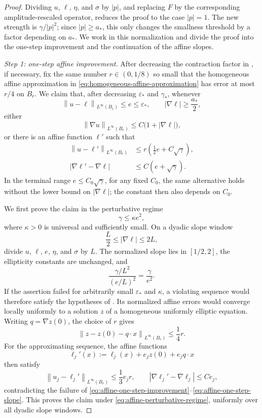 \documentclass[11pt,letterpaper]{amsart}
\numberwithin{equation}{section}
\newcommand{\norm}[1]{\left\lVert #1\right\rVert}
\theoremstyle{definition}
\theoremstyle{remark}
\begin{document}
\begin{proof}
Dividing $u$, $\ell$, $\eta$, and $\sigma$ by $|p|$, and replacing $F$ by
the corresponding amplitude-rescaled operator, reduces the proof to the
case $|p|=1$. The new strength is $\gamma/|p|^2$; since $|p|\geq a_*$,
this only changes the smallness threshold by a factor depending on $a_*$. We
work in this normalization and divide the proof into the one-step
improvement and the continuation of the affine slopes.

\medskip
\noindent
\emph{Step 1: one-step affine improvement.}
After decreasing the contraction factor in
, if necessary, fix the same number
$r\in(0,1/8)$ so small that the homogeneous affine approximation in
\eqref{eq:homogeneous-affine-approximation} has error at most $r/4$ on
$B_r$. We claim that, after decreasing $\varepsilon_*$ and $\gamma_*$,
whenever
$$
\norm{u-\ell}_{L^\infty(B_1)}\leq e\leq\varepsilon_*,
\qquad
|\nabla\ell|\geq\frac{a_*}{2},
$$
either
\begin{equation}\label{eq:affine-one-step-lipschitz}
\norm{\nabla u}_{L^\infty(B_r)}
\leq C\bigl(1+|\nabla\ell|\bigr),
\end{equation}
or there is an affine function $\ell'$ such that
\begin{align}
\norm{u-\ell'}_{L^\infty(B_r)}
&\leq
r\left(\frac12e+C\sqrt\gamma\right),
\label{eq:affine-one-step-improvement}
\\
|\nabla\ell'-\nabla\ell|
&\leq
C\left(e+\sqrt\gamma\right).
\label{eq:affine-one-step-slope}
\end{align}
In the terminal range $e\leq C_0\sqrt\gamma$, for any fixed $C_0$, the
same alternative holds without the lower bound on $|\nabla\ell|$; the
constant then also depends on $C_0$.

We first prove the claim in the perturbative regime
\begin{equation}\label{eq:affine-perturbative-regime}
\gamma\leq\kappa e^2,
\end{equation}
where $\kappa>0$ is universal and sufficiently small. On a dyadic slope
window
$$
\frac{L}{2}\leq|\nabla\ell|\leq2L,
$$
divide $u$, $\ell$, $e$, $\eta$, and $\sigma$ by $L$. The normalized slope
lies in $[1/2,2]$, the ellipticity constants are unchanged, and
$$
\frac{\gamma/L^2}{(e/L)^2}
=
\frac\gamma{e^2}.
$$
If the assertion failed for arbitrarily small $\varepsilon_*$ and
$\kappa$, a violating sequence would therefore satisfy the hypotheses of
. Its normalized affine errors
would converge locally uniformly to a solution $z$ of a homogeneous
uniformly elliptic equation. Writing $q=\nabla z(0)$, the choice of $r$
gives
$$
\norm{z-z(0)-q\cdot x}_{L^\infty(B_r)}
\leq\frac14r.
$$
For the approximating sequence, the affine functions
$$
\ell_j'(x)
:=
\ell_j(x)+e_jz(0)+e_jq\cdot x
$$
then satisfy
$$
\norm{u_j-\ell_j'}_{L^\infty(B_r)}
\leq\frac13e_jr,
\qquad
|\nabla\ell_j'-\nabla\ell_j|
\leq Ce_j,
$$
contradicting the failure of
\eqref{eq:affine-one-step-improvement}--\eqref{eq:affine-one-step-slope}.
This proves the claim under \eqref{eq:affine-perturbative-regime}, uniformly
over all dyadic slope windows.


\end{proof}
\end{document}
